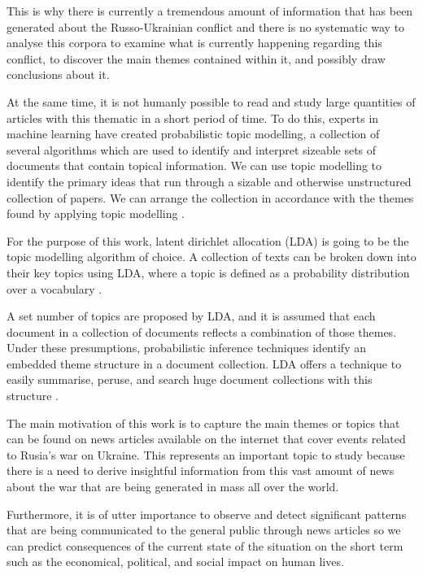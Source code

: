 \documentclass[twoside,12pt,a4paper]{article}
\begin{document}
This is why there is currently a tremendous amount of information that has been generated about the Russo-Ukrainian conflict and there is no systematic way to analyse this corpora to examine what is currently happening regarding this conflict, to discover the main themes contained within it, and possibly draw conclusions about it.

At the same time, it is not humanly possible to read and study large quantities of articles with this thematic in a short period of time. To do this, experts in machine learning have created probabilistic topic modelling, a collection of several algorithms which are used to identify and interpret sizeable sets of documents that contain topical information. We can use topic modelling to identify the primary ideas that run through a sizable and otherwise unstructured collection of papers. We can arrange the collection in accordance with the themes found by applying topic modelling \citep{blei_probabilistic_2012}.

For the purpose of this work, latent dirichlet allocation (LDA) is going to be the topic modelling algorithm of choice. A collection of texts can be broken down into their key topics using LDA, where a topic is defined as a probability distribution over a vocabulary \citep{blei_latent_nodate}.

A set number of topics are proposed by LDA, and it is assumed that each document in a collection of documents reflects a combination of those themes. Under these presumptions, probabilistic inference techniques identify an embedded theme structure in a document collection. LDA offers a technique to easily summarise, peruse, and search huge document collections with this structure \citep{blei_probabilistic_2010}.

The main motivation of this work is to capture the main themes or topics that can be found on news articles available on the internet that cover events related to Rusia’s war on Ukraine. This represents an important topic to study because there is a need to derive insightful information from this vast amount of news about the war that are being generated in mass all over the world.

Furthermore, it is of utter importance to observe and detect significant patterns that are being communicated to the general public through news articles so we can predict consequences of the current state of the situation on the short term such as the economical, political, and social impact on human lives.
\end{document}
